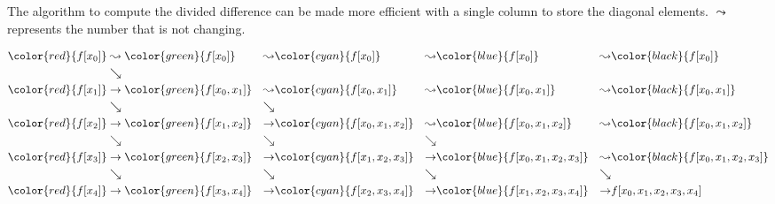 \begin{remark}
    The algorithm to compute the divided difference can be made more efficient with a single column to store the diagonal elements. $\leadsto$ represents the number that is not changing.
    \begin{tcolorbox}
        \begin{equation}
        \begin{aligned}
            \color{red}{f[x_0]} &    \leadsto  \color{green}{f[x_0]}          & \leadsto& \color{cyan}{f[x_0]} &\leadsto& \color{blue}{f[x_0]} &\leadsto& \color{black}{f[x_0]}\\ 
                   &\searrow       &\\ 
                   \color{red}{f[x_1]} &\to \color{green}{f[x_0, x_1]}&  \leadsto& \color{cyan}{f[x_0, x_1]}  &\leadsto& \color{blue}{f[x_0, x_1]} &\leadsto& \color{black}{f[x_0, x_1]}\\
                   &\searrow        &\searrow&\\ 
                   \color{red}{f[x_2]} & \to \color{green}{f[x_1, x_2]}&\to& \color{cyan}{f[x_0, x_1, x_2]} &\leadsto& \color{blue}{f[x_0, x_1, x_2]}&\leadsto& \color{black}{f[x_0, x_1, x_2]}\\
                   &\searrow        &\searrow& &\searrow&\\ 
                   \color{red}{f[x_3]} &\to \color{green}{f[x_2, x_3] }&\to& \color{cyan}{f[x_1, x_2, x_3]} &\to & \color{blue}{f[x_0, x_1, x_2, x_3]}&\leadsto& \color{black}{f[x_0, x_1, x_2, x_3]}\\
                   &\searrow        &\searrow & &\searrow&  &\searrow &\\ 
                   \color{red}{f[x_4]} & \to \color{green}{f[x_3, x_4]}&\to& \color{cyan}{f[x_2, x_3, x_4]} &\to & \color{blue}{f[x_1, x_2, x_3, x_4]} &\to&  f[x_0, x_1, x_2, x_3, x_4] 
        \end{aligned}
    \end{equation}
    \end{tcolorbox}
\end{remark}

